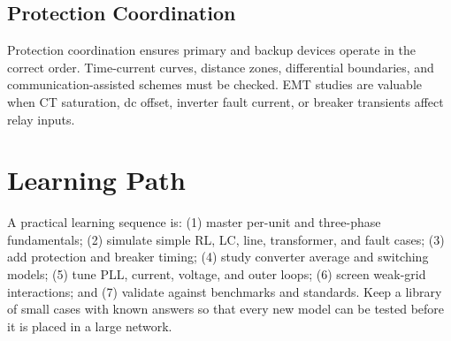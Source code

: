 \documentclass[11pt]{article}
\begin{document}
\subsection{Protection Coordination}
Protection coordination ensures primary and backup devices operate in the correct order. Time-current curves, distance zones, differential boundaries, and communication-assisted schemes must be checked. EMT studies are valuable when CT saturation, dc offset, inverter fault current, or breaker transients affect relay inputs.

\section*{Learning Path}
A practical learning sequence is: (1) master per-unit and three-phase fundamentals; (2) simulate simple RL, LC, line, transformer, and fault cases; (3) add protection and breaker timing; (4) study converter average and switching models; (5) tune PLL, current, voltage, and outer loops; (6) screen weak-grid interactions; and (7) validate against benchmarks and standards. Keep a library of small cases with known answers so that every new model can be tested before it is placed in a large network.



\end{document}
